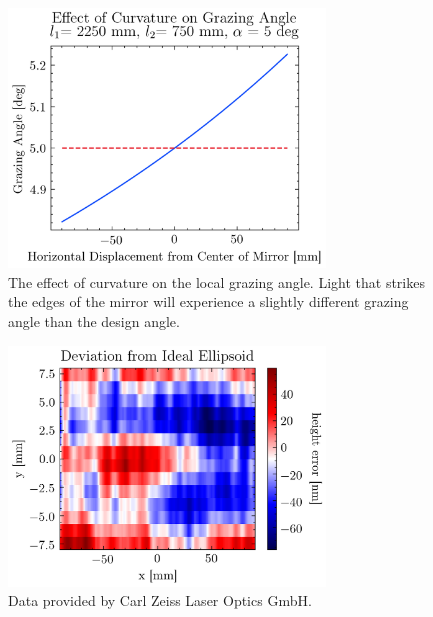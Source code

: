 \begin{figure}
	\centering
	\includegraphics[width=0.75\textwidth]{figures/chap2/EM_angle.png}
	\caption{The effect of curvature on the local grazing angle. Light that strikes the edges of the mirror will experience a slightly different grazing angle than the design angle.}
	\label{fig:EM_angle}
\end{figure}

\begin{figure}
	\centering
	\includegraphics[width=0.75\textwidth]{figures/chap2/EM_error.png}
	\caption{Data provided by Carl Zeiss Laser Optics GmbH.}
	\label{fig:EM_error}
\end{figure}

